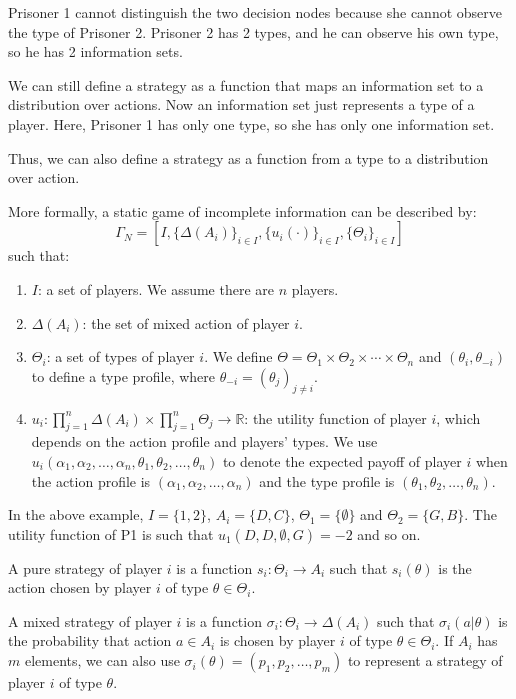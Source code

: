 \documentclass[12pt, oneside]{article}
\begin{document}
\break
Prisoner 1 cannot distinguish the two decision nodes because she cannot observe the type of Prisoner 2.
Prisoner 2 has 2 types, and he can observe his own type, so he has 2 information sets.

We can still define a strategy as a function that maps an information set to a distribution over actions.
Now an information set just represents a type of a player. Here, Prisoner 1 has only one type, so she has only one information set.

Thus, we can also define a strategy as a function from a type to a distribution over action.

More formally, a static game of incomplete information can be described by:
\[
\Gamma_N = [I, \{\Delta(A_i)\}_{i \in I}, \{u_i(\cdot)\}_{i \in I}, \{\Theta_i\}_{i \in I}]
\]
such that:

\begin{enumerate}
    \item \( I \): a set of players. We assume there are \( n \) players.
    \item \( \Delta(A_i) \): the set of mixed action of player \( i \).
    \item \( \Theta_i \): a set of types of player \( i \). We define \( \Theta = \Theta_1 \times \Theta_2 \times \cdots \times \Theta_n \) and \( (\theta_i, \theta_{-i}) \) to define a type profile, where \( \theta_{-i} = (\theta_j)_{j \neq i} \).
    \item \( u_i : \prod_{j=1}^{n} \Delta(A_i) \times \prod_{j=1}^{n} \Theta_j \to \mathbb{R} \): the utility function of player \( i \), which depends on the action profile and players’ types. We use \( u_i(\alpha_1, \alpha_2, \dots, \alpha_n, \theta_1, \theta_2, \dots, \theta_n) \) to denote the expected payoff of player \( i \) when the action profile is \( (\alpha_1, \alpha_2, \dots, \alpha_n) \) and the type profile is \( (\theta_1, \theta_2, \dots, \theta_n) \).
\end{enumerate}

In the above example, \( I = \{1,2\} \), \( A_i = \{D,C\} \), \( \Theta_1 = \{\emptyset\} \) and \( \Theta_2 = \{G, B\} \). The utility function of P1 is such that \( u_1(D, D, \emptyset, G) = -2 \) and so on.

A pure strategy of player \( i \) is a function \( s_i : \Theta_i \to A_i \) such that \( s_i(\theta) \) is the action chosen by player \( i \) of type \( \theta \in \Theta_i \).

A mixed strategy of player \( i \) is a function \( \sigma_i : \Theta_i \to \Delta(A_i) \) such that \( \sigma_i(a | \theta) \) is the probability that action \( a \in A_i \) is chosen by player \( i \) of type \( \theta \in \Theta_i \). If \( A_i \) has \( m \) elements, we can also use \( \sigma_i(\theta) = (p_1, p_2, \dots, p_m) \) to represent a strategy of player \( i \) of type \( \theta \).
\end{document}
